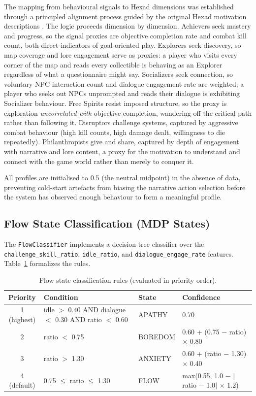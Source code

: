 The mapping from behavioural signals to Hexad dimensions was established through a principled alignment process guided by the original Hexad motivation descriptions \citep{tondello2016hexad}. The logic proceeds dimension by dimension. Achievers seek mastery and progress, so the signal proxies are objective completion rate and combat kill count, both direct indicators of goal-oriented play. Explorers seek discovery, so map coverage and lore engagement serve as proxies: a player who visits every corner of the map and reads every collectible is behaving as an Explorer regardless of what a questionnaire might say. Socializers seek connection, so voluntary NPC interaction count and dialogue engagement rate are weighted; a player who seeks out NPCs unprompted and reads their dialogue is exhibiting Socializer behaviour. Free Spirits resist imposed structure, so the proxy is exploration \textit{uncorrelated with} objective completion, wandering off the critical path rather than following it. Disruptors challenge systems, captured by aggressive combat behaviour (high kill counts, high damage dealt, willingness to die repeatedly). Philanthropists give and share, captured by depth of engagement with narrative and lore content, a proxy for the motivation to understand and connect with the game world rather than merely to conquer it.

All profiles are initialised to 0.5 (the neutral midpoint) in the absence of data, preventing cold-start artefacts from biasing the narrative action selection before the system has observed enough behaviour to form a meaningful profile.

\subsection{Flow State Classification (MDP States)}

The \texttt{FlowClassifier} implements a decision-tree classifier over the \texttt{challenge\_skill\_ratio}, \texttt{idle\_ratio}, and \texttt{dialogue\_engage\_rate} features. Table~\ref{tab:flow_rules} formalizes the rules.

\begin{table}[H]
\centering
\caption{Flow state classification rules (evaluated in priority order).}
\label{tab:flow_rules}
\small
\begin{tabular}{@{}cp{6.2cm}ll@{}}
\toprule
\textbf{Priority} & \textbf{Condition} & \textbf{State} & \textbf{Confidence} \\
\midrule
1 (highest) & idle $>$ 0.40 AND dialogue $<$ 0.30 AND ratio $<$ 0.60 & APATHY & 0.70 \\[3pt]
2 & ratio $<$ 0.75 & BOREDOM & 0.60 + (0.75 $-$ ratio) $\times$ 0.80 \\[3pt]
3 & ratio $>$ 1.30 & ANXIETY & 0.60 + (ratio $-$ 1.30) $\times$ 0.40 \\[3pt]
4 (default) & 0.75 $\leq$ ratio $\leq$ 1.30 & FLOW & max(0.55, 1.0 $-$ $|$ratio $-$ 1.0$|$ $\times$ 1.2) \\
\bottomrule
\end{tabular}
\end{table}

